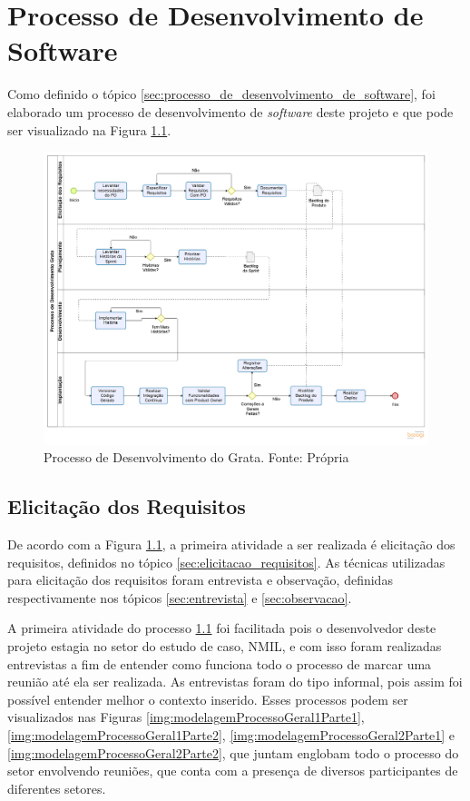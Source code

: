 \chapter[Processo de Desenvolvimento de Software]{Processo de Desenvolvimento de Software}
\label{cp:processo_de_desenvolvimento}

Como definido o tópico \ref{sec:processo_de_desenvolvimento_de_software}, foi elaborado um processo de desenvolvimento de \textit{software} deste projeto e que pode ser visualizado na Figura \ref{img:processo_de_desenvolvimento}.

\begin{figure}[H]
	\centering
	\includegraphics[width=1.0\textwidth]{figuras/processo_de_desenvolvimento.png}
	\caption{Processo de Desenvolvimento do Grata. Fonte: Própria}
	\label{img:processo_de_desenvolvimento}
\end{figure}

\section{Elicitação dos Requisitos}

De acordo com a Figura \ref{img:processo_de_desenvolvimento}, a primeira atividade a ser realizada é elicitação dos requisitos, definidos no tópico \ref{sec:elicitacao_requisitos}. As técnicas utilizadas para elicitação dos requisitos foram entrevista e observação, definidas respectivamente nos tópicos \ref{sec:entrevista} e \ref{sec:observacao}. 

A primeira atividade do processo \ref{img:processo_de_desenvolvimento} foi facilitada pois o desenvolvedor deste projeto estagia no setor do estudo de caso, NMIL, e com isso foram realizadas entrevistas a fim de entender como funciona todo o processo de marcar uma reunião até ela ser realizada. As entrevistas foram do tipo informal, pois assim foi possível entender melhor o contexto inserido. Esses processos podem ser visualizados nas Figuras \ref{img:modelagemProcessoGeral1Parte1}, \ref{img:modelagemProcessoGeral1Parte2}, \ref{img:modelagemProcessoGeral2Parte1} e \ref{img:modelagemProcessoGeral2Parte2}, que juntam englobam todo o processo do setor envolvendo reuniões, que conta com a presença de diversos participantes de diferentes setores.

